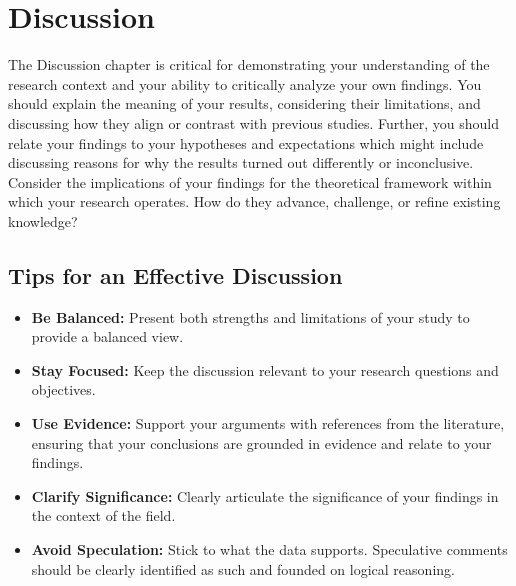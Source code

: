\chapter{Discussion}
\label{ch:discussion}

The Discussion chapter is critical for demonstrating your understanding of the research context and your ability to critically analyze your own findings. You should explain the meaning of your results, considering their limitations, and discussing how they align or contrast with previous studies. Further, you should relate your findings to your hypotheses and expectations which might include discussing reasons for why the results turned out differently or inconclusive. Consider the implications of your findings for the theoretical framework within which your research operates. How do they advance, challenge, or refine existing knowledge?

\section{Tips for an Effective Discussion}
\begin{itemize}
    \item \textbf{Be Balanced:} Present both strengths and limitations of your study to provide a balanced view.
    \item \textbf{Stay Focused:} Keep the discussion relevant to your research questions and objectives.
    \item \textbf{Use Evidence:} Support your arguments with references from the literature, ensuring that your conclusions are grounded in evidence and relate to your findings.
    \item \textbf{Clarify Significance:} Clearly articulate the significance of your findings in the context of the field.
    \item \textbf{Avoid Speculation:} Stick to what the data supports. Speculative comments should be clearly identified as such and founded on logical reasoning.
\end{itemize}
